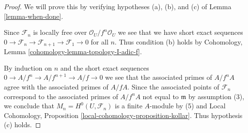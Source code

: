 \documentclass{stacks-project}
\theoremstyle{plain}
\theoremstyle{definition}
\theoremstyle{remark}
\numberwithin{equation}{subsection}
\begin{document}
\begin{proof}
We will prove this by verifying hypotheses (a), (b), and (c) of
Lemma \ref{lemma-when-done}.

\medskip\noindent
Since $\mathcal{F}_n$ is locally free over $\mathcal{O}_U/f^n\mathcal{O}_U$
we see that we have short exact sequences
$0 \to \mathcal{F}_n \to \mathcal{F}_{n + 1} \to \mathcal{F}_1 \to 0$
for all $n$. Thus condition (b) holds by
Cohomology, Lemma \ref{cohomology-lemma-topology-I-adic-f}.

\medskip\noindent
By induction on $n$ and the short exact sequences
$0 \to A/f^n \to A/f^{n + 1} \to A/f \to 0$ we see that
the associated primes of $A/f^nA$ agree with the associated
primes of $A/fA$. Since the associated points of $\mathcal{F}_n$
correspond to the associated primes of $A/f^nA$ not equal to $\mathfrak m$
by assumption (3), we conclude that
$M_n = H^0(U, \mathcal{F}_n)$ is a finite $A$-module by (5) and
Local Cohomology, Proposition \ref{local-cohomology-proposition-kollar}.
Thus hypothesis (c) holds.


\end{proof}
\end{document}
